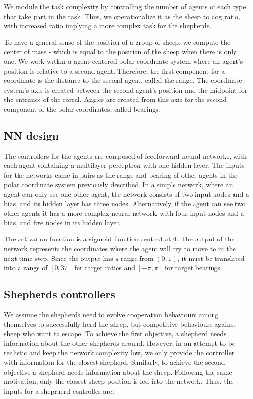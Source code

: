 \documentclass[conference]{IEEEtran}
\begin{document}
We module the task complexity by controlling the number of agents of each type that take part in the task. Thus, we operationalize it as the sheep to dog ratio, with increased ratio implying a more complex task for the shepherds.

To have a general sense of the position of a group of sheep, we compute the center of mass - which is equal to the position of the sheep when there is only one.
We work within a agent-centered polar coordinate system where an agent's position is relative to a second agent. Therefore, the first component for a coordinate is the distance to the second agent, called the range. The coordinate system's axis is created between the second agent's position and the midpoint for the entrance of the corral. Angles are created from this axis for the second component of the polar coordinates, called bearings. 


\subsection{NN design}
The controllers for the agents are composed of feedforward neural networks, with each agent containing a multilayer perceptron with one hidden layer. The inputs for the networks come in pairs as the range and bearing of other agents in the polar coordinate system previously described. In a simple network, where an agent can only see one other agent, the network consists of two input nodes and a bias, and its hidden layer has three nodes. Alternatively, if the agent can see two other agents it has a more complex neural network, with four input nodes and a bias, and five nodes in its hidden layer. 

The activation function is a sigmoid function centred at 0. The output of the network represents the coordinates where the agent will try to move to in the next time step. Since the output has a range from $(0, 1)$, it must be translated into a range of $[0, 37]$ for target ratios and $[-\pi, \pi]$ for target bearings. 
 
\subsection{Shepherds controllers}
We assume the shepherds need to evolve cooperation behaviours among themselves to successfully herd the sheep, but competitive behaviours against sheep who want to escape. To achieve the first objective, a shepherd needs information about the other shepherds around. However, in an attempt to be realistic and keep the network complexity low, we only provide the controller with information for the closest shepherd. Similarly, to achieve the second objective a shepherd needs information about the sheep. Following the same motivation, only the closest sheep position is fed into the network. Thus, the inputs for a sheprherd controller are: 
\end{document}
